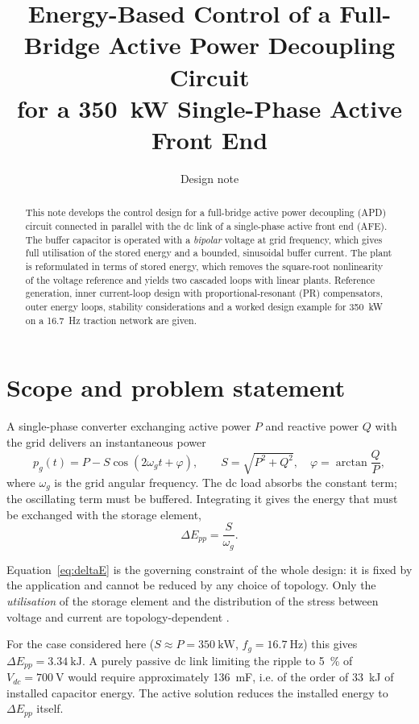 \documentclass[11pt,a4paper]{article}
\title{Energy-Based Control of a Full-Bridge Active Power Decoupling Circuit\\
for a \SI{350}{\kilo\watt} Single-Phase Active Front End}
\author{Design note}
\date{}
\begin{document}
\maketitle

\begin{abstract}
This note develops the control design for a full-bridge active power decoupling
(APD) circuit connected in parallel with the dc link of a single-phase active
front end (AFE). The buffer capacitor is operated with a \emph{bipolar} voltage
at grid frequency, which gives full utilisation of the stored energy and a
bounded, sinusoidal buffer current. The plant is reformulated in terms of stored
energy, which removes the square-root nonlinearity of the voltage reference and
yields two cascaded loops with linear plants. Reference generation, inner
current-loop design with proportional-resonant (PR) compensators, outer energy
loops, stability considerations and a worked design example for
\SI{350}{\kilo\watt} on a \SI{16.7}{\hertz} traction network are given.
\end{abstract}

\section{Scope and problem statement}

A single-phase converter exchanging active power $P$ and reactive power $Q$ with
the grid delivers an instantaneous power
\begin{equation}
p_g(t) = P - S\cos(2\omega_g t + \varphi),
\qquad S=\sqrt{P^2+Q^2},\quad \varphi=\arctan\frac{Q}{P},
\label{eq:pg}
\end{equation}
where $\omega_g$ is the grid angular frequency. The dc load absorbs the constant
term; the oscillating term must be buffered. Integrating it gives the energy
that must be exchanged with the storage element,
\begin{equation}
\Delta E_{pp} = \frac{S}{\omega_g}.
\label{eq:deltaE}
\end{equation}

Equation~\eqref{eq:deltaE} is the governing constraint of the whole design: it
is fixed by the application and cannot be reduced by any choice of topology.
Only the \emph{utilisation} of the storage element and the distribution of the
stress between voltage and current are topology-dependent
\cite{sun2016review,qin2016benchmark}.

For the case considered here ($S\approx P=\SI{350}{\kilo\watt}$,
$f_g=\SI{16.7}{\hertz}$) this gives $\Delta E_{pp}=\SI{3.34}{\kilo\joule}$. A
purely passive dc link limiting the ripple to \SI{5}{\percent} of
$V_{dc}=\SI{700}{\volt}$ would require approximately \SI{136}{\milli\farad},
i.e. of the order of \SI{33}{\kilo\joule} of installed capacitor energy. The
active solution reduces the installed energy to
$\Delta E_{pp}$ itself.
\end{document}
